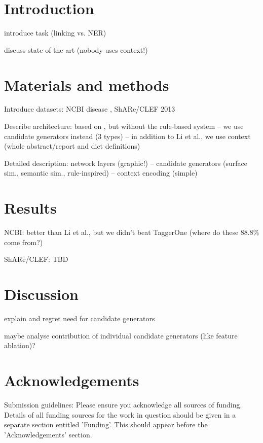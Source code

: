 \documentclass{bioinfo}
\begin{document}
\section{Introduction}

introduce task (linking vs. NER)

discuss state of the art (nobody uses context!)



\section{Materials and methods}

Introduce datasets:
NCBI disease \citep{islamaj-dogan-et-al:2014},
ShARe/CLEF 2013 \citep{pradhan-et-al:2013:CLEF}

Describe architecture:
based on \cite{lihaodi-et-al:2017}, but without the rule-based system --
we use candidate generators instead (3 types) --
in addition to Li et al., we use context (whole abstract/report and dict definitions)

Detailed description:
network layers (graphic!) --
candidate generators (surface sim., semantic sim., rule-inspired) --
context encoding (simple)



\section{Results}

NCBI: better than Li et al., but we didn't beat TaggerOne
(where do these 88.8\% come from?)

ShARe/CLEF: TBD



\section{Discussion}

explain and regret need for candidate generators

maybe analyse contribution of individual candidate generators (like feature ablation)?



\section*{Acknowledgements}

Submission guidelines:
Please ensure you acknowledge all sources of funding.
Details of all funding sources for the work in question should be given in a separate section entitled 'Funding'. This should appear before the 'Acknowledgements' section.
\end{document}
